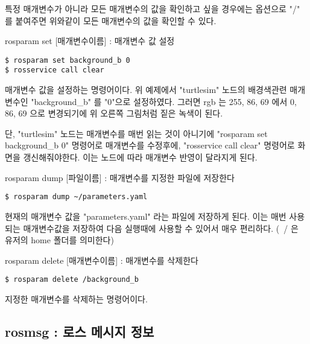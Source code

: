 \noindent
특정 매개변수가 아니라 모든 매개변수의 값을 확인하고 싶을 경우에는 옵션으로 "/" 를 붙여주면 위와같이 모든 매개변수의 값을 확인할 수 있다.

\vspace{\baselineskip}
\noindent
{}\circled{\thenum} rosparam set [매개변수이름] : 매개변수 값 설정 

\begin{lstlisting}[language=ROS]
$ rosparam set background_b 0
$ rosservice call clear
\end{lstlisting}

\noindent
매개변수 값을 설정하는 명령어이다. 위 예제에서 "turtlesim" 노드의 배경색관련 매개변수인 "background\_b" 를 "0"으로 설정하였다. 그러면 rgb 는 255, 86, 69 에서 0, 86, 69 으로 변경되기에 위 오른쪽 그림처럼 짙은 녹색이 된다.

단, "turtlesim" 노드는 매개변수를 매번 읽는 것이 아니기에 "rosparam set background\_b 0" 명령어로 매개변수를 수정후에, "rosservice call clear" 명령어로 화면을 갱신해줘야한다. 이는 노드에 따라 매개변수 반영이 달라지게 된다.

\vspace{\baselineskip}
\noindent
{}\circled{\thenum} rosparam dump [파일이름] : 매개변수를 지정한 파일에 저장한다

\begin{lstlisting}[language=ROS]
$ rosparam dump ~/parameters.yaml
\end{lstlisting}

\noindent
현재의 매개변수 값을 "parameters.yaml" 라는 파일에 저장하게 된다. 이는 매번 사용되는 매개변수값을 저장하여 다음 실행때에 사용할 수 있어서 매우 편리하다. (~/ 은 유저의 home 폴더를 의미한다)

\vspace{\baselineskip}
\noindent
{}\circled{\thenum} rosparam delete [매개변수이름] : 매개변수를 삭제한다

\begin{lstlisting}[language=ROS]
$ rosparam delete /background_b
\end{lstlisting}

\noindent
지정한 매개변수를 삭제하는 명령어이다.

\subsection{rosmsg : 로스 메시지 정보}

